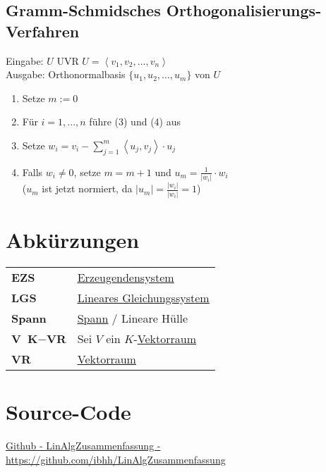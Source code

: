 \documentclass{scrartcl}
\newcommand{\linkTo}[1]{\hyperref[#1]{\underline{#1}}}
\begin{document}
\subsection{Gramm-Schmidsches Orthogonalisierungs-Verfahren}
Eingabe: $U$ UVR \(U = \left< v_1, v_2, ..., v_n \right>\)\\
Ausgabe: Orthonormalbasis \(\{u_1, u_2, ..., u_m\}\) von \(U\)

\begin{enumerate}[label={(\arabic*)}]
\item Setze $m := 0$
\item Für $i = 1, ..., n$ führe (3) und (4) aus
\item Setze $w_i = v_i - \sum_{j = 1}^m \left< u_j, v_j \right> \cdot u_j$
\item Falls $w_i \neq 0$, setze $m = m + 1$ und $u_m = \frac{1}{|w_i|} \cdot w_i$\\
($u_m$ ist jetzt normiert, da $|u_m| = \frac{|w_i|}{|w_i|} = 1$)
\end{enumerate}


\section{Abkürzungen}

\begin{tabular}{p{}p{}}
\textbf{EZS} & \linkTo{Erzeugendensystem}\\
\textbf{LGS}\label{LGS} & \linkTo{Lineares Gleichungssystem} \\
\textbf{Spann} & \linkTo{Spann} / Lineare Hülle\\
\textbf{V~K$-$VR} & Sei $V$ ein $K$-\linkTo{Vektorraum}\\
\textbf{VR} & \linkTo{Vektorraum} \\
\end{tabular}

\section{Source-Code}

\href{https://github.com/ibhh/LinAlgZusammenfassung}{Github - LinAlgZusammenfassung - https://github.com/ibhh/LinAlgZusammenfassung}
\end{document}
